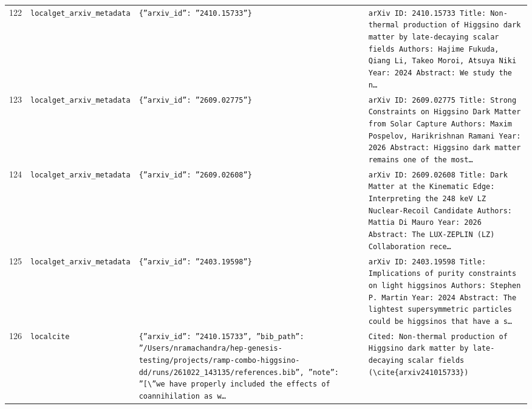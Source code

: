 \documentclass[11pt,a4paper]{article}
\begin{document}
\begin{longtable}{@{}p{}p{}p{}p{}@{}}
122 & \texttt{local}\newline\texttt{get\_\allowbreak{}arxiv\_\allowbreak{}metadata} & \texttt{\{''arxiv\_\allowbreak{}id'':\allowbreak{} ''2410.15733''\}\allowbreak{}} & \texttt{arXiv ID:\allowbreak{} 2410.15733 Title:\allowbreak{} Non-thermal production of Higgsino dark matter by late-decaying scalar fields Authors:\allowbreak{} Hajime Fukuda,\allowbreak{} Qiang Li,\allowbreak{} Takeo Moroi,\allowbreak{} Atsuya Niki Year:\allowbreak{} 2024 Abstract:\allowbreak{} We study the n\ldots{}\allowbreak{}} \\
123 & \texttt{local}\newline\texttt{get\_\allowbreak{}arxiv\_\allowbreak{}metadata} & \texttt{\{''arxiv\_\allowbreak{}id'':\allowbreak{} ''2609.02775''\}\allowbreak{}} & \texttt{arXiv ID:\allowbreak{} 2609.02775 Title:\allowbreak{} Strong Constraints on Higgsino Dark Matter from Solar Capture Authors:\allowbreak{} Maxim Pospelov,\allowbreak{} Harikrishnan Ramani Year:\allowbreak{} 2026 Abstract:\allowbreak{} Higgsino dark matter remains one of the most\ldots{}\allowbreak{}} \\
124 & \texttt{local}\newline\texttt{get\_\allowbreak{}arxiv\_\allowbreak{}metadata} & \texttt{\{''arxiv\_\allowbreak{}id'':\allowbreak{} ''2609.02608''\}\allowbreak{}} & \texttt{arXiv ID:\allowbreak{} 2609.02608 Title:\allowbreak{} Dark Matter at the Kinematic Edge:\allowbreak{} Interpreting the 248 keV LZ Nuclear-Recoil Candidate Authors:\allowbreak{} Mattia Di Mauro Year:\allowbreak{} 2026 Abstract:\allowbreak{} The LUX-ZEPLIN (LZ)\allowbreak{} Collaboration rece\ldots{}\allowbreak{}} \\
125 & \texttt{local}\newline\texttt{get\_\allowbreak{}arxiv\_\allowbreak{}metadata} & \texttt{\{''arxiv\_\allowbreak{}id'':\allowbreak{} ''2403.19598''\}\allowbreak{}} & \texttt{arXiv ID:\allowbreak{} 2403.19598 Title:\allowbreak{} Implications of purity constraints on light higgsinos Authors:\allowbreak{} Stephen P. Martin Year:\allowbreak{} 2024 Abstract:\allowbreak{} The lightest supersymmetric particles could be higgsinos that have a s\ldots{}\allowbreak{}} \\
126 & \texttt{local}\newline\texttt{cite} & \texttt{\{''arxiv\_\allowbreak{}id'':\allowbreak{} ''2410.15733'',\allowbreak{} ''bib\_\allowbreak{}path'':\allowbreak{} ''/\allowbreak{}Users/\allowbreak{}nramachandra/\allowbreak{}hep-genesis-testing/\allowbreak{}projects/\allowbreak{}ramp-combo-higgsino-dd/\allowbreak{}runs/\allowbreak{}261022\_\allowbreak{}143135/\allowbreak{}references.bib'',\allowbreak{} ''note'':\allowbreak{} ''[\textbackslash{}\allowbreak{}''we have properly included the effects of coannihilation as w\ldots{}\allowbreak{}} & \texttt{Cited:\allowbreak{} Non-thermal production of Higgsino dark matter by late-decaying scalar fields (\textbackslash{}\allowbreak{}cite\{arxiv241015733\}\allowbreak{})\allowbreak{}} \\

\end{longtable}
\end{document}
